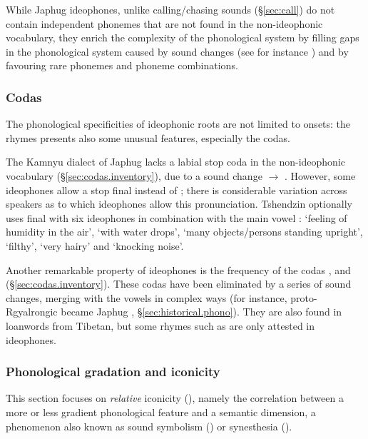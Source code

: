 While Japhug ideophones, unlike calling/chasing sounds (§\ref{sec:call}) do not contain independent phonemes that are not found  in the non-ideophonic vocabulary, they enrich the complexity of the phonological system by filling gaps in the phonological system caused by sound changes (see for instance \citealt{diffloth79expressive}) and by favouring rare phonemes and phoneme combinations.

\subsubsection{Codas} \label{sec:coda.idph}
The phonological specificities of ideophonic roots are not limited to onsets: the rhymes presents also some unusual features, especially the codas.

The Kamnyu dialect of Japhug lacks a labial stop coda in the non-ideophonic vocabulary (§\ref{sec:codas.inventory}), due to a sound change  $\rightarrow$ . However, some ideophones allow a stop final   instead of ; there is considerable variation across speakers as to which ideophones allow this pronunciation. Tshendzin optionally uses final  with six ideophones in combination with the main vowel :  `feeling of humidity in the air',  `with water drops',  `many objects/persons standing upright',  `filthy',  `very hairy' and  `knocking noise'.

Another remarkable property of ideophones is the frequency of the codas ,  and  (§\ref{sec:codas.inventory}). These codas have been eliminated by a series of sound changes, merging with the vowels in complex ways (for instance, proto-Rgyalrongic  became Japhug , §\ref{sec:historical.phono}). They are also found in loanwords from Tibetan, but some rhymes such as  are only attested in ideophones.
 
 
\subsubsection{Phonological gradation and iconicity} \label{sec:idph.gradation}
This section focuses on \textit{relative} iconicity (\citealt[47]{dingemanse11ezra}), namely the correlation between a more or less gradient phonological feature and a semantic dimension, a phenomenon also known as sound symbolism  (\citealt[16]{deloria41})  or synesthesia (\citealt[186--187]{gerner04expressives1}).
 

